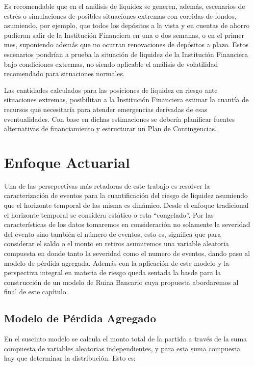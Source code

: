 \documentclass[]{article}
\begin{document}
Es recomendable que en el análisis de liquidez se generen, además,
escenarios de estrés o simulaciones de posibles situaciones extremas con
corridas de fondos, asumiendo, por ejemplo, que todos los depósitos a la
vista y en cuentas de ahorro pudieran salir de la Institución Financiera
en una o dos semanas, o en el primer mes, suponiendo además que no
ocurran renovaciones de depósitos a plazo. Estos escenarios pondrían a
prueba la situación de liquidez de la Institución Financiera bajo
condiciones extremas, no siendo aplicable el análisis de volatilidad
recomendado para situaciones normales.

Las cantidades calculados para las posiciones de liquidez en riesgo ante
situaciones extremas, posibilitan a la Institución Financiera estimar la
cuantía de recursos que necesitaría para atender emergencias derivadas
de esas eventualidades. Con base en dichas estimaciones se debería
planificar fuentes alternativas de financiamiento y estructurar un Plan
de Contingencias.

\hypertarget{enfoque-actuarial}{%
\section{Enfoque Actuarial}\label{enfoque-actuarial}}

Una de las persepectivas más retadoras de este trabajo es resolver la
caracterización de eventos para la cuantificación del riesgo de liquidez
asumiendo que el horizonte temporal de las misma es dinámico. Desde el
enfoque tradicional el horizonte temporal se considera estático o esta
``congelado''. Por las características de los datos tomaremos en
consideración no solamente la severidad del evento sino también el
número de eventos, esto es, significa que para considerar el saldo o el
monto en retiros asumiremos una variable aleatoria compuesta en donde
tanto la severidad como el numero de eventos, dando paso al modelo de
pérdida agregada. Además con la aplicación de este modelo y la
perspectiva integral en materia de riesgo queda sentada la basde para la
construcción de un modelo de Ruina Bancario cuya propuesta abordaremos
al final de este capítulo.

\hypertarget{modelo-de-perdida-agregado}{%
\subsection{Modelo de Pérdida
Agregado}\label{modelo-de-perdida-agregado}}

En el suscinto modelo se calcula el monto total de la partida a través
de la suma compuesta de variables aleatorias independientes, y para esta
suma compuesta hay que determinar la distribución. Esto es:
\end{document}
